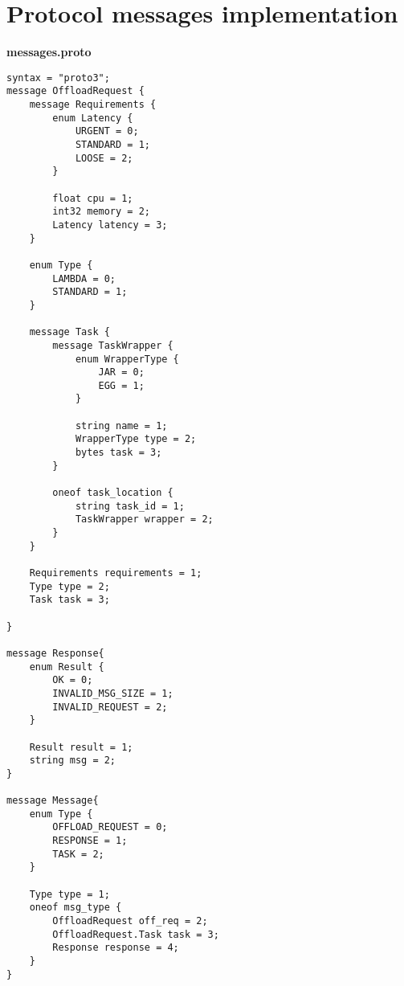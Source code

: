 \chapter{Protocol messages implementation}
\label{proto_file}
\begin{center}
{\textbf{messages.proto}}
\begin{lstlisting}
syntax = "proto3";
message OffloadRequest {
    message Requirements {
        enum Latency {
            URGENT = 0;
            STANDARD = 1;
            LOOSE = 2;
        }

        float cpu = 1;
        int32 memory = 2;
        Latency latency = 3;
    }
    
    enum Type {
    	LAMBDA = 0;
    	STANDARD = 1;
    }

    message Task {
        message TaskWrapper {
            enum WrapperType {
                JAR = 0;
                EGG = 1;
            }

            string name = 1;
            WrapperType type = 2;
            bytes task = 3;
        }

        oneof task_location {
            string task_id = 1;
            TaskWrapper wrapper = 2;
        }
    }

    Requirements requirements = 1;
    Type type = 2;
    Task task = 3;

}

message Response{
    enum Result {
        OK = 0;
        INVALID_MSG_SIZE = 1;
        INVALID_REQUEST = 2;
    }

    Result result = 1;
    string msg = 2;
}

message Message{
    enum Type {
        OFFLOAD_REQUEST = 0;
        RESPONSE = 1;
        TASK = 2;
    }

    Type type = 1;
    oneof msg_type {
        OffloadRequest off_req = 2;
        OffloadRequest.Task task = 3;
        Response response = 4;
    }
}
\end{lstlisting}
\end{center}